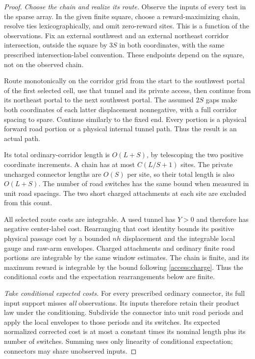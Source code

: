 \begin{proof}
\emph{Choose the chain and realize its route.}
Observe the inputs of every test in the sparse array.  In the given
finite square, choose a reward-maximizing chain, resolve ties
lexicographically, and omit zero-reward sites.  This is a function of the
observations.  Fix an
external southwest and an external northeast corridor intersection,
outside the square by $3S$ in both coordinates, with the same prescribed
intersection-label convention.  These endpoints depend on the square,
not on the observed chain.

Route monotonically on the corridor grid from the start to the southwest
portal of the first selected cell, use that tunnel and its private access,
then continue from its northeast portal to the next southwest portal.
The assumed $2S$ gaps make both coordinates of each latter displacement
nonnegative, with a full corridor spacing to spare.  Continue similarly
to the fixed end.  Every portion is a physical forward road portion or a
physical internal tunnel path.  Thus the result is an actual path.

Its total ordinary-corridor length is $O(L+S)$, by telescoping the two
positive coordinate increments.  A chain has at most $C(L/S+1)$ sites.
The private uncharged connector lengths are $O(S)$ per site, so their
total length is also $O(L+S)$.  The number of road switches has the same
bound when measured in unit road spacings.  The two short charged
attachments at each site are excluded from this count.

All selected route costs are integrable. A used tunnel has $Y>0$ and
therefore has negative center-label cost. Rearranging that cost identity
bounds its positive physical passage cost by a bounded $nh$ displacement
and the integrable local gauge and raw-arm envelopes. Charged attachments
and ordinary finite road portions are integrable by the same window
estimates. The chain is finite, and its maximum reward is integrable by
the bound following \eqref{access:charge}. Thus the conditional costs
and the expectation rearrangements below are finite.

\emph{Take conditional expected costs.}
For every prescribed ordinary connector, its full input support misses
\emph{all} observations.  Its inputs therefore retain their product law
under the conditioning.  Subdivide the connector into unit road periods
and apply the local envelopes to those periods and its switches.  Its
expected normalized corrected cost is at most a constant times its
nominal length plus its number of switches.  Summing uses only linearity
of conditional expectation; connectors may share unobserved inputs.


\end{proof}
